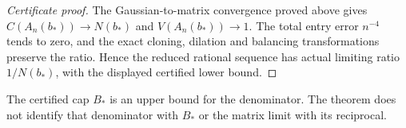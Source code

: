 \begin{proof}[Certificate proof]
The Gaussian-to-matrix convergence proved above gives
$C(A_n(b_*))\to N(b_*)$ and $V(A_n(b_*))\to1$.
The total entry error $n^{-4}$ tends to zero, and the exact cloning,
dilation and balancing transformations preserve the ratio.
Hence the reduced rational sequence has actual limiting ratio
$1/N(b_*)$, with the displayed certified lower bound.
\end{proof}
The certified cap $B_*$ is an upper bound for the denominator.
The theorem does not identify that denominator with $B_*$ or the
matrix limit with its reciprocal.
